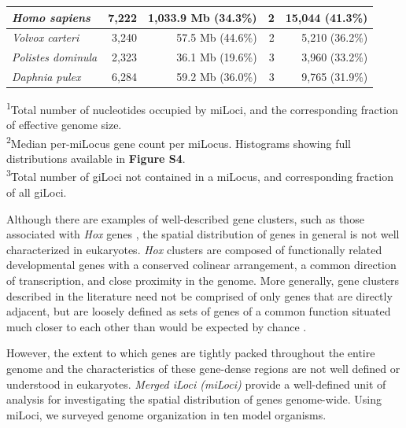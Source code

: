\begin{table}
\begin{tabularx}{\textwidth}{lrrrr}
\textit{Homo sapiens}               &                7,222 &          1,033.9 Mb (34.3\%) &                             2 &               15,044 (41.3\%)  \\ \hline
\textit{Volvox carteri}             &                3,240 &             57.5 Mb (44.6\%) &                             2 &                5,210 (36.2\%)  \\
\textit{Polistes dominula}          &                2,323 &             36.1 Mb (19.6\%) &                             3 &                3,960 (33.2\%)  \\
\textit{Daphnia pulex}              &                6,284 &             59.2 Mb (36.0\%) &                             3 &                9,765 (31.9\%)  \\ \hline
\end{tabularx}
\raggedright
{\scriptsize
\textsuperscript{1}Total number of nucleotides occupied by miLoci, and the corresponding fraction of effective genome size. \\
\textsuperscript{2}Median per-miLocus gene count per miLocus. Histograms showing full distributions available in \textbf{Figure S4}.  \\
\textsuperscript{3}Total number of giLoci not contained in a miLocus, and corresponding fraction of all giLoci.
}
\end{table}

Although there are examples of well-described gene clusters, such as those associated with \textit{Hox} genes \cite{HoxClusters}, the spatial distribution of genes in general is not well characterized in eukaryotes.
\textit{Hox} clusters are composed of functionally related developmental genes with a conserved colinear arrangement, a common direction of transcription, and close proximity in the genome.
More generally, gene clusters described in the literature need not be comprised of only genes that are directly adjacent, but are loosely defined as sets of genes of a common function situated much closer to each other than would be expected by chance \cite{ClusterFunc}.

However, the extent to which genes are tightly packed throughout the entire genome and the characteristics of these gene-dense regions are not well defined or understood in eukaryotes.
\textit{Merged iLoci (miLoci)} provide a well-defined unit of analysis for investigating the spatial distribution of genes genome-wide.
Using miLoci, we surveyed genome organization in ten model organisms.

